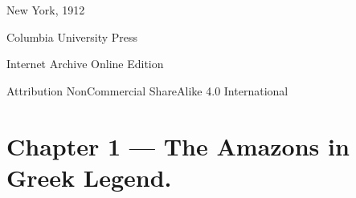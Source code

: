 \documentclass[a4paper, 12pt, oneside]{article}
\begin{document}
\begin{titlepage}
		
	\vspace*{\fill}%
	
	{\small New York, 1912}%
	
	{\small Columbia University Press} %

	\vspace{1\baselineskip} %

    Internet Archive Online Edition  %
	
	{\small Attribution NonCommercial ShareAlike 4.0 International } %
\end{titlepage}
\clearpage
\pagestyle{fancy}
\fancyhf{}
\cfoot{\Fontauri{\thepage}}
\Large
\tableofcontents
\clearpage
\paragraph{}
\section{Chapter 1 --- The Amazons in Greek Legend.}
\end{document}
